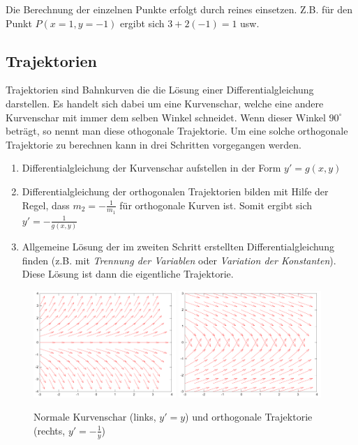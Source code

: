 \noindent
Die Berechnung der einzelnen Punkte erfolgt durch reines einsetzen.
Z.B. für den Punkt $P(x=1, y=-1)$ ergibt sich $3+2(-1)=1$ usw.

\subsection{Trajektorien}
Trajektorien sind Bahnkurven die die Lösung einer Differentialgleichung
darstellen. Es handelt sich dabei um eine Kurvenschar, welche eine andere
Kurvenschar mit immer dem selben Winkel schneidet. Wenn dieser Winkel
$90^{\circ}$ beträgt, so nennt man diese othogonale Trajektorie.
Um eine solche orthogonale Trajektorie zu berechnen kann in drei Schritten
vorgegangen werden.
\begin{enumerate}
  \item Differentialgleichung der Kurvenschar aufstellen in der Form
	$y'=g(x,y)$
  \item Differentialgleichung der orthogonalen Trajektorien bilden
	mit Hilfe der Regel, dass $m_2=-\frac{1}{m_1}$ für orthogonale
	Kurven ist. Somit ergibt sich $y'=-\frac{1}{g(x,y)}$
  \item Allgemeine Lösung der im zweiten Schritt erstellten
	Differentialgleichung finden (z.B. mit \emph{Trennung der Variablen}
	oder \emph{Variation der Konstanten}). Diese Lösung ist dann die 
	eigentliche Trajektorie.
\end{enumerate}

\begin{figure}[h!]
	\centering
	\includegraphics[width=0.48\textwidth]{trajektorien1.pdf}
	\includegraphics[width=0.48\textwidth]{trajektorien2.pdf}
	\caption{Normale Kurvenschar (links, $y'=y$) 
	und orthogonale Trajektorie (rechts, $y'=-\frac{1}{y}$)}
\end{figure}

